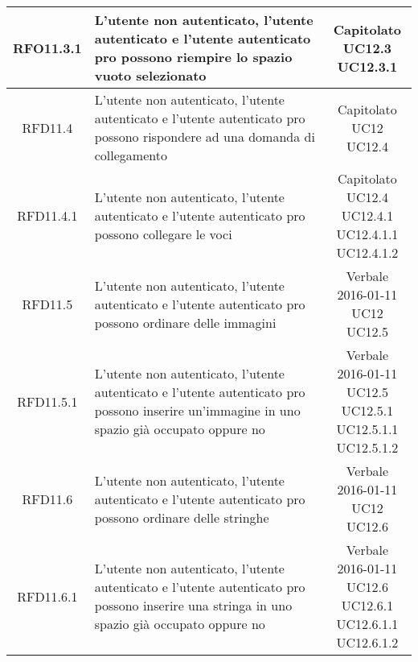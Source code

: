 \begin{longtable}{|c|>{\centering}m{7cm}|c|}
			 \hypertarget{{RFO11.3.1}}{{RFO11.3.1}} & L’utente non autenticato, l’utente autenticato e l’utente autenticato pro possono riempire lo spazio vuoto selezionato & \makecell{Capitolato\\ UC12.3 \\UC12.3.1 } \\ \hline
			 \hypertarget{{RFD11.4}}{{RFD11.4}} & L’utente non autenticato, l’utente autenticato e l’utente autenticato pro possono rispondere ad una domanda di collegamento & \makecell{Capitolato\\ UC12 \\UC12.4 } \\ \hline
			 \hypertarget{{RFD11.4.1}}{{RFD11.4.1}} & L’utente non autenticato, l’utente autenticato e l’utente autenticato pro possono collegare le voci & \makecell{Capitolato\\ UC12.4 \\UC12.4.1 \\UC12.4.1.1 \\UC12.4.1.2 } \\ \hline
			 \hypertarget{{RFD11.5}}{{RFD11.5}} & L’utente non autenticato, l’utente autenticato e l’utente autenticato pro possono ordinare delle immagini & \makecell{Verbale 2016-01-11\\ UC12 \\UC12.5 } \\ \hline
			 \hypertarget{{RFD11.5.1}}{{RFD11.5.1}} & L’utente non autenticato, l’utente autenticato e l’utente autenticato pro possono inserire un’immagine in uno spazio già occupato oppure no & \makecell{Verbale 2016-01-11\\ UC12.5 \\UC12.5.1 \\UC12.5.1.1 \\UC12.5.1.2 } \\ \hline
			 \hypertarget{{RFD11.6}}{{RFD11.6}} & L’utente non autenticato, l’utente autenticato e l’utente autenticato pro possono ordinare delle stringhe & \makecell{Verbale 2016-01-11\\ UC12 \\UC12.6 } \\ \hline
			 \hypertarget{{RFD11.6.1}}{{RFD11.6.1}} & L’utente non autenticato, l’utente autenticato e l’utente autenticato pro possono inserire una stringa in uno spazio già occupato oppure no & \makecell{Verbale 2016-01-11\\ UC12.6 \\UC12.6.1 \\UC12.6.1.1 \\UC12.6.1.2 } \\ \hline

\end{longtable}
